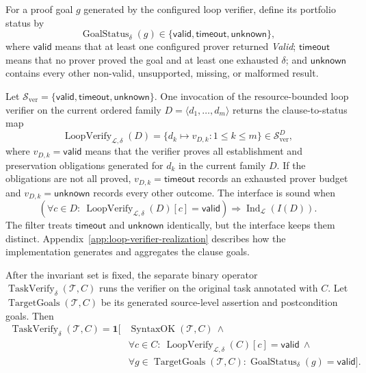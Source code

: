 For a proof goal \(g\) generated by the configured loop verifier, define its
portfolio status by
\begin{equation}
  \operatorname{GoalStatus}_{\delta}(g)
  \in\{\mathsf{valid},\mathsf{timeout},\mathsf{unknown}\},
  \label{eq:formal-goal-status}
\end{equation}
where \(\mathsf{valid}\) means that at least one configured prover returned
\emph{Valid}; \(\mathsf{timeout}\) means that no prover proved the goal and at
least one exhausted \(\delta\); and \(\mathsf{unknown}\) contains every other
non-valid, unsupported, missing, or malformed result.

Let \(\mathcal S_{\mathrm{ver}}=
\{\mathsf{valid},\mathsf{timeout},\mathsf{unknown}\}\).  One invocation
of the resource-bounded loop verifier on the current ordered family
\(D=\langle d_1,\ldots,d_m\rangle\) returns the clause-to-status map
\begin{equation}
  \operatorname{LoopVerify}_{\mathcal L,\delta}(D)
  =\{d_k\mapsto v_{D,k}:1\le k\le m\}
  \in\mathcal S_{\mathrm{ver}}^{D},
  \label{eq:formal-loop-verify-map}
\end{equation}
where \(v_{D,k}=\mathsf{valid}\) means that the verifier proves all
establishment and preservation obligations generated for \(d_k\) in the
current family \(D\).  If the obligations are not all proved,
\(v_{D,k}=\mathsf{timeout}\) records an exhausted prover budget and
\(v_{D,k}=\mathsf{unknown}\) records every other outcome.  The interface is
sound when
\begin{equation}
  \left(\forall c\in D:\
    \operatorname{LoopVerify}_{\mathcal L,\delta}(D)[c]=\mathsf{valid}\right)
  \Longrightarrow \operatorname{Ind}_{\mathcal L}(I(D)).
  \label{eq:formal-loop-verify-soundness}
\end{equation}
The filter treats \(\mathsf{timeout}\) and \(\mathsf{unknown}\) identically,
but the interface keeps them distinct.  Appendix~\ref{app:loop-verifier-realization}
describes how the implementation generates and aggregates the clause goals.

After the invariant set is fixed, the separate binary operator
\(\operatorname{TaskVerify}_{\delta}(\mathcal T,C)\) runs the verifier on the
original task annotated with \(C\).  Let
\(\operatorname{TargetGoals}(\mathcal T,C)\) be its generated source-level
assertion and postcondition goals.  Then
\begin{equation}
\begin{split}
\operatorname{TaskVerify}_{\delta}(\mathcal T,C)
=\mathbf 1\bigl[&\operatorname{SyntaxOK}(\mathcal T,C)\ \land\\
&\forall c\in C:\
  \operatorname{LoopVerify}_{\mathcal L,\delta}(C)[c]=\mathsf{valid}\ \land\\
&\forall g\in\operatorname{TargetGoals}(\mathcal T,C):
  \operatorname{GoalStatus}_{\delta}(g)=\mathsf{valid}\bigr].
\end{split}
\label{eq:formal-task-verify}
\end{equation}

